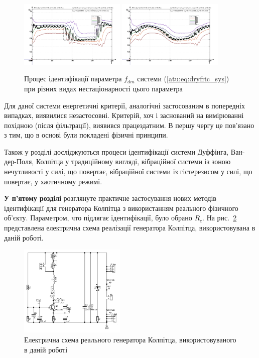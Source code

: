 \documentclass[a4paper,13pt]{atuaref}
\begin{document}
\begin{figure}[htb!]
\centerline{
  \includegraphics[width=0.45\textwidth]{p5/p/cha/fric/fric_m5p-pl_n_sign.png}
  \includegraphics[width=0.45\textwidth]{p5/p/cha/fric/fric_m5p-pl_n_sin.png}
}
\caption{
  Процес ідентифікації параметра $ f_{dm} $ системи (\ref{atu:eq:dryfric_sys}) при різних видах нестаціонарності цього параметра
}
\label{atu:f:fric_id}
\end{figure}

Для даної системи енергетичні критерії, аналогічні застосованим в попередніх
випадках, виявилися незастосовні. Критерій, хоч і заснований на вимірюванні
похідною (після фільтрації), виявився працездатним. В першу чергу це пов'язано
з тим, що в основі були покладені фізичні принципи.


Також у розділі досліджуються процеси ідентифікації системи Дуффінга, Ван-дер-Поля,
Колпітца у традиційному вигляді, вібраційної системи
із зоною нечутливості у силі, що повертає, вібраційної системи
із гістерезисом у силі, що повертає, у хаотичному режимі.


\textbf{У п'ятому розділі}
розглянуте практичне застосування
нових методів ідентифікації для генератора Колпітца
з використанням реального фізичного об'єкту.
Параметром, что підлягає ідентифікації, було обрано $R_c$.
На рис.~\ref{atu:f:colp_schem_real} представлена електрична схема реалізації
генератора Колпітца, використовувана в даній роботі.

\begin{figure}[htb!]
\centerline{\includegraphics[width=0.45\textwidth]{p6/p/colp_schem_real.png} }
\caption{Електрична схема реального генератора Колпітца, використовуваного в даній роботі}
\label{atu:f:colp_schem_real}
\end{figure}
\end{document}
